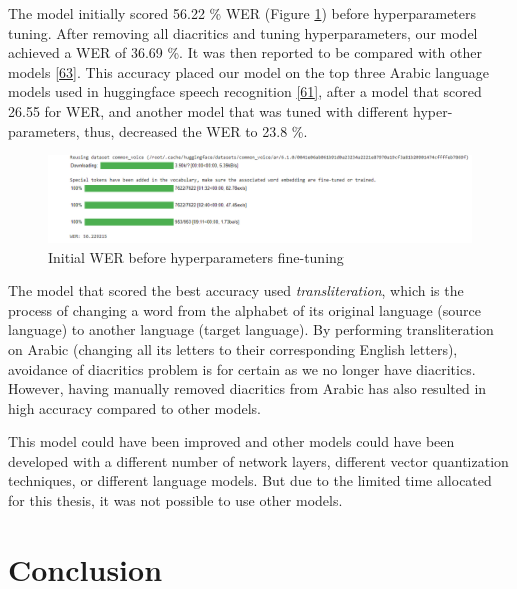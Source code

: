\documentclass[
  a4paper,
]{article}
\begin{document}
The model initially scored 56.22 \% WER (Figure \ref{fig:WER_after_800})
before hyperparameters tuning. After removing all diacritics and tuning
hyperparameters, our model achieved a WER of 36.69 \%. It was then
reported to be compared with other models
\protect\hyperlink{ref-themodel}{{[}63{]}}. This accuracy placed our
model on the top three Arabic language models used in huggingface speech
recognition \protect\hyperlink{ref-paperswithcode}{{[}61{]}}, after a
model that scored 26.55 for WER, and another model that was tuned with
different hyper-parameters, thus, decreased the WER to 23.8 \%.

\begin{figure}

{\centering \includegraphics{WER_after_800} 

}

\caption{Initial WER before hyperparameters fine-tuning}\label{fig:WER_after_800}
\end{figure}

The model that scored the best accuracy used \emph{transliteration},
which is the process of changing a word from the alphabet of its
original language (source language) to another language (target
language). By performing transliteration on Arabic (changing all its
letters to their corresponding English letters), avoidance of diacritics
problem is for certain as we no longer have diacritics. However, having
manually removed diacritics from Arabic has also resulted in high
accuracy compared to other models.

This model could have been improved and other models could have been
developed with a different number of network layers, different vector
quantization techniques, or different language models. But due to the
limited time allocated for this thesis, it was not possible to use other
models.

\newpage

\hypertarget{conclusion}{%
\section{Conclusion}\label{conclusion}}
\end{document}
